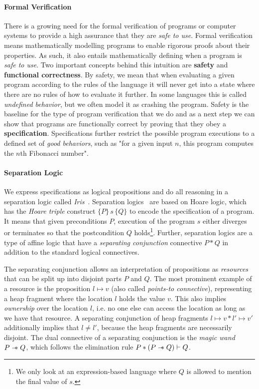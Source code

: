 \paragraph{Formal Verification}
There is a growing need for the formal verification of programs or computer systems to provide a high assurance that they are \emph{safe to use}.
Formal verification means mathematically modelling programs to enable rigorous proofs about their properties.
As such, it also entails mathematically defining when a program is \emph{safe to use}.
Two important concepts behind this intuition are \textbf{safety} and \textbf{functional correctness}.
By safety, we mean that when evaluating a given program according to the rules of the language
it will never get into a state where there are no rules of how to evaluate it further.
In some languages this is called \emph{undefined behavior}, but we often model it as crashing the program.
Safety is the baseline for the type of program verification that we do and as a next step we can show that programs are functionally correct by proving that they obey a \textbf{specification}.
Specifications further restrict the possible program executions to a defined set of \emph{good behaviors}, such as "for a given input \(n\), this program computes the \(n\)th Fibonacci number".

\paragraph{Separation Logic}
We express specifications as logical propositions and do all reasoning in a separation logic called \emph{Iris}~\cite{jung2018iris}.
Separation logics~\cite{reynolds2002separation} are based on Hoare logic, which has the \emph{Hoare triple} construct \(\{P\}\,s\,\{Q\}\) to encode the specification of a program.
It means that given preconditions \(P\), execution of the program \(s\) either diverges or terminates so that the postcondition \(Q\) holds\footnote{We only look at an expression-based language where \(Q\) is allowed to mention the final value of \(s\).}.
Further, separation logics are a type of affine logic that have a \emph{separating conjunction} connective \(P \ast Q\) in addition to the standard logical connectives.

The separating conjunction allows an interpretation of propositions as \emph{resources} that can be split up into disjoint parts \(P\) and \(Q\).
The most prominent example of a resource is the proposition \(l \mapsto v\) (also called \emph{points-to connective}), representing a heap fragment where the location \(l\) holds the value \(v\).
This also implies \emph{ownership} over the location \(l\), i.e. no one else can access the location as long as we have that resource.
A separating conjunction of heap fragments \(l \mapsto v \ast l' \mapsto v'\) additionally implies that \(l \neq l'\), because the heap fragments are necessarily disjoint.
The dual connective of a separating conjunction is the \emph{magic wand} \(P \mathrel{-\!\!\ast} Q\), which follows the elimination rule \(P \ast (P \mathrel{-\!\!\ast} Q) \vdash Q\).

